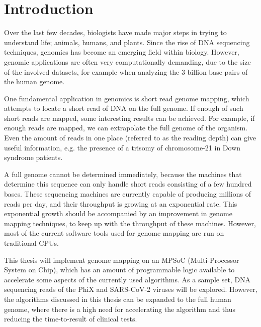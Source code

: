 
\chapter{Introduction}

Over the last few decades, biologists have made major steps in trying to understand life; animals, humans, and plants. Since the rise of DNA sequencing techniques, genomics has become an emerging field within biology. However, genomic applications are often very computationally demanding, due to the size of the involved datasets, for example when analyzing the 3 billion base pairs of the human genome.

One fundamental application in genomics is short read genome mapping, which attempts to locate a short read of DNA on the full genome. If enough of such short reads are mapped, some interesting results can be achieved. For example, if enough reads are mapped, we can extrapolate the full genome of the organism. Even the amount of reads in one place (referred to as the reading depth) can give useful information, e.g. the presence of a trisomy of chromosome-21 in Down syndrome patients.

A full genome cannot be determined immediately, because the machines that determine this sequence can only handle short reads consisting of a few hundred bases. These sequencing machines are currently capable of producing millions of reads per day, and their throughput is growing at an exponential rate. This exponential growth should be accompanied by an improvement in genome mapping techniques, to keep up with the throughput of these machines. However, most of the current software tools used for genome mapping are run on traditional CPUs. 

This thesis will implement genome mapping on an MPSoC (Multi-Processor System on Chip), which has an amount of programmable logic available to accelerate some aspects of the currently used algorithms. As a sample set, DNA sequencing reads of the PhiX and SARS-CoV-2 viruses will be explored. However, the algorithms discussed in this thesis can be expanded to the full human genome, where there is a high need for accelerating the algorithm and thus reducing the time-to-result of clinical tests.


